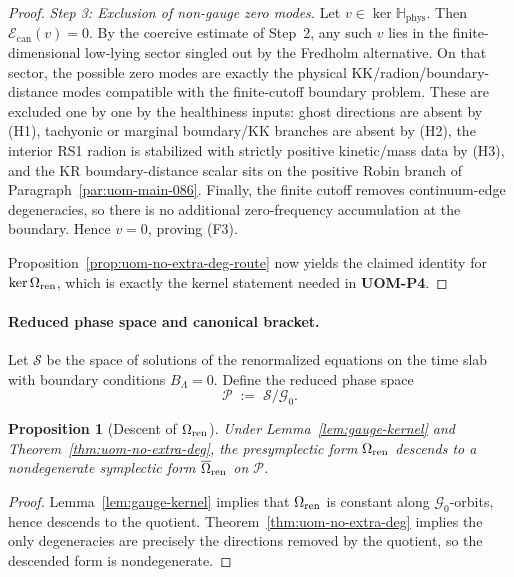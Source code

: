 \documentclass[10pt]{article}
\theoremstyle{definition}
\theoremstyle{plain}
\newtheorem{proposition}{Proposition}[section]
\begin{document}
\begin{proof}
\emph{Step 3: Exclusion of non-gauge zero modes.}
Let $v\in\ker \mathbb H_{\mathrm{phys}}$.  Then $\mathcal E_{\mathrm{can}}(v)=0$.  By the coercive estimate of Step~2, any such $v$ lies in the
finite-dimensional low-lying sector singled out by the Fredholm alternative.  On that sector, the possible zero modes are exactly the physical
KK/radion/boundary-distance modes compatible with the finite-cutoff boundary problem.  These are excluded one by one by the healthiness inputs:
ghost directions are absent by \textnormal{(H1)}, tachyonic or marginal boundary/KK branches are absent by \textnormal{(H2)}, the interior RS1
radion is stabilized with strictly positive kinetic/mass data by \textnormal{(H3)}, and the KR boundary-distance scalar sits on the positive
Robin branch of Paragraph~\ref{par:uom-main-086}.  Finally, the finite cutoff removes continuum-edge degeneracies, so there is no additional
zero-frequency accumulation at the boundary.  Hence $v=0$, proving \textnormal{(F3)}.

Proposition~\ref{prop:uom-no-extra-deg-route} now yields the claimed identity for $\ker \Omega_{\rm ren}$,
which is exactly the kernel statement needed in \textbf{UOM-P4}.
\end{proof}

\paragraph{Reduced phase space and canonical bracket.}
Let $\mathcal S$ be the space of solutions of the renormalized equations on the time slab with boundary conditions $B_\Lambda=0$.
Define the reduced phase space
\[
\mathcal P\;:=\;\mathcal S/\mathcal G_0.
\]

\begin{proposition}[Descent of $\Omega_{\rm ren}$]
\label{prop:Omega-descends}
Under Lemma~\ref{lem:gauge-kernel} and Theorem~\ref{thm:uom-no-extra-deg}, the presymplectic form $\Omega_{\rm ren}$
descends to a \emph{nondegenerate} symplectic form $\overline\Omega_{\rm ren}$ on $\mathcal P$.
\end{proposition}

\begin{proof}
Lemma~\ref{lem:gauge-kernel} implies that $\Omega_{\rm ren}$ is constant along $\mathcal G_0$-orbits, hence descends to the quotient.
Theorem~\ref{thm:uom-no-extra-deg} implies the only degeneracies are precisely the directions removed by the quotient, so the descended form is
nondegenerate.
\end{proof}
\end{document}
